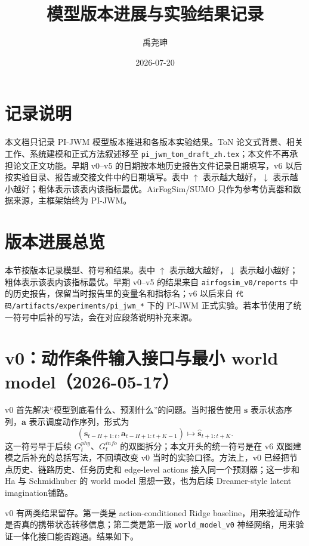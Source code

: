 \documentclass[UTF8,a4paper,11pt]{ctexart}
\title{\pjwm{} 模型版本进展与实验结果记录}
\author{禹尧珅}
\date{2026-07-20}
\newcommand{\code}[1]{\texttt{#1}}
\newcommand{\pjwm}{PI-JWM}
\begin{document}
\pagestyle{plain}
\maketitle
\section*{记录说明}
本文档只记录 \pjwm{} 模型版本推进和各版本实验结果。ToN 论文式背景、相关工作、系统建模和正式方法叙述移至 \code{pi\_jwm\_ton\_draft\_zh.tex}；本文件不再承担论文正文功能。早期 v0--v5 的日期按本地历史报告文件记录日期填写，v6 以后按实验目录、报告或交接文件中的日期填写。表中 $\uparrow$ 表示越大越好，$\downarrow$ 表示越小越好；粗体表示该表内该指标最优。AirFogSim/SUMO 只作为参考仿真器和数据来源，主框架始终为 \pjwm{}。
\section{版本进展总览}

本节按版本记录模型、符号和结果。表中 $\uparrow$ 表示越大越好，$\downarrow$ 表示越小越好；粗体表示该表内该指标最优。早期 v0--v5 的结果来自 \code{airfogsim\_v0/reports} 中的历史报告，保留当时报告里的变量名和指标名；v6 以后来自 \code{代码/artifacts/experiments/pi\_jwm\_*} 下的 PI-JWM 正式实验。若本节使用了统一符号中后补的写法，会在对应段落说明补充来源。

\section{v0：动作条件输入接口与最小 world model（2026-05-17）}

v0 首先解决“模型到底看什么、预测什么”的问题。当时报告使用 $\mathbf{s}$ 表示状态序列，$\mathbf{a}$ 表示调度动作序列，形式为
\[
(\mathbf{s}_{t-H+1:t},\mathbf{a}_{t-H+1:t+K-1})\mapsto \hat{\mathbf{s}}_{t+1:t+K}.
\]
这一符号早于后续 $G_t^{phy}$、$G_t^{info}$ 的双图拆分；本文开头的统一符号是在 v6 双图建模之后补充的总括写法，不回填改变 v0 当时的实验口径。方法上，v0 已经把节点历史、链路历史、任务历史和 edge-level actions 接入同一个预测器；这一步和 Ha 与 Schmidhuber 的 world model 思想一致，也为后续 Dreamer-style latent imagination铺路。

v0 有两类结果留存。第一类是 action-conditioned Ridge baseline，用来验证动作是否真的携带状态转移信息；第二类是第一版 \code{world\_model\_v0} 神经网络，用来验证一体化接口能否跑通。结果如下。

\begin{table}[H]
\centering
\small
{}
\caption{v0 动作条件 baseline 在 held-out seed 4 上的结果。}
\end{table}
\end{document}
